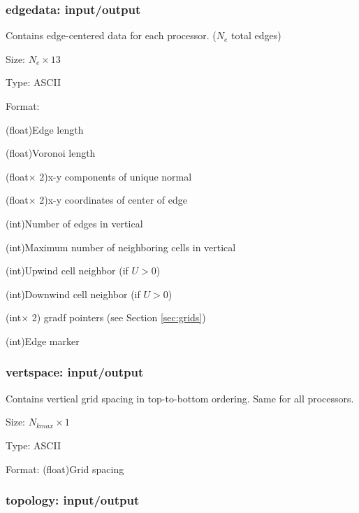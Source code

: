 \subsubsection{edgedata: input/output}

Contains edge-centered data for each processor. ($N_e$ total edges)
\begin{list}{}
\item Size: $N_e\times 13$
\item Type: ASCII
\item Format:
\begin{list}{}
\item (float)Edge length
\item (float)Voronoi length 
\item (float$\times$ 2)x-y components of unique normal
\item (float$\times$ 2)x-y coordinates of center of edge
\item (int)Number of edges in vertical
\item (int)Maximum number of neighboring cells in vertical
\item (int)Upwind cell neighbor (if $U>0$)
\item (int)Downwind cell neighbor (if $U>0$)
\item (int$\times$ 2) gradf pointers (see Section \ref{sec:grids})
\item (int)Edge marker
\end{list}
\end{list}

\subsubsection{vertspace: input/output}

Contains vertical grid spacing in top-to-bottom ordering.  Same for all processors.
\begin{list}{}
\item Size: $N_{kmax}\times 1$
\item Type: ASCII
\item Format: (float)Grid spacing
\end{list}

\subsubsection{topology: input/output}

